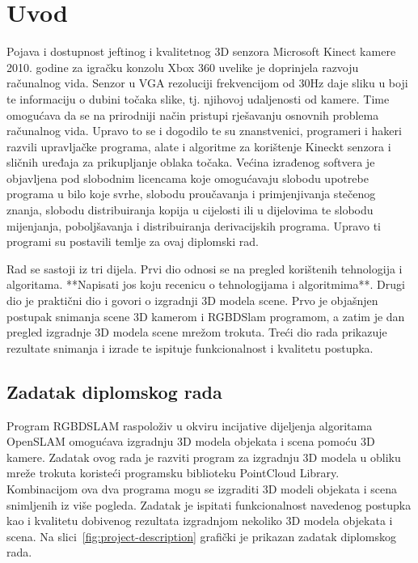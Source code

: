 \newpage

\setcounter{page}{1}
\setcounter{figure}{0}
\section{Uvod}%
\label{sec:Uvod}


Pojava i dostupnost jeftinog i kvalitetnog 3D senzora Microsoft Kinect
kamere 2010. godine za igračku konzolu Xbox 360 uvelike je doprinjela
razvoju računalnog vida. Senzor u VGA rezoluciji frekvencijom od 30Hz
daje sliku u boji te informaciju o dubini točaka slike, tj. njihovoj
udaljenosti od kamere. Time omogućava da se na prirodniji način pristupi
rješavanju osnovnih problema računalnog vida.  Upravo to se i dogodilo
te su znanstvenici, programeri i hakeri razvili upravljačke programa,
alate i algoritme za korištenje Kineckt senzora i sličnih uređaja za
prikupljanje oblaka točaka. Većina izrađenog softvera je objavljena pod
slobodnim licencama koje omogućavaju slobodu upotrebe programa u bilo
koje svrhe, slobodu proučavanja i primjenjivanja stečenog znanja,
slobodu distribuiranja kopija u cijelosti ili u dijelovima te slobodu
mijenjanja, poboljšavanja i distribuiranja derivacijskih programa.
Upravo ti programi su postavili temlje za ovaj diplomski rad.

Rad se sastoji iz tri dijela. Prvi dio odnosi se na pregled korištenih
tehnologija i algoritama. **Napisati jos koju recenicu o tehnologijama i
algoritmima**. Drugi dio je praktični dio i govori o izgradnji 3D modela
scene. Prvo je objašnjen postupak snimanja scene 3D kamerom i RGBDSlam
programom, a zatim je dan pregled izgradnje 3D modela scene mrežom
trokuta. Treći dio rada prikazuje rezultate snimanja i izrade te ispituje
funkcionalnost i kvalitetu postupka.

\newpage
\subsection{Zadatak diplomskog rada} %
\label{sub:Zadatak diplomskog rada}

Program RGBDSLAM raspoloživ u okviru incijative dijeljenja algoritama
OpenSLAM omogućava izgradnju 3D modela objekata i scena pomoću 3D
kamere. Zadatak ovog rada je razviti program za izgradnju 3D modela u
obliku mreže trokuta koristeći programsku biblioteku PointCloud Library.
Kombinacijom ova dva programa mogu se izgraditi 3D modeli objekata i
scena snimljenih iz više pogleda. Zadatak je ispitati funkcionalnost
navedenog postupka kao i kvalitetu dobivenog rezultata izgradnjom
nekoliko 3D modela objekata i scena. Na
slici~\ref{fig:project-description} grafički je prikazan zadatak
diplomskog rada.


